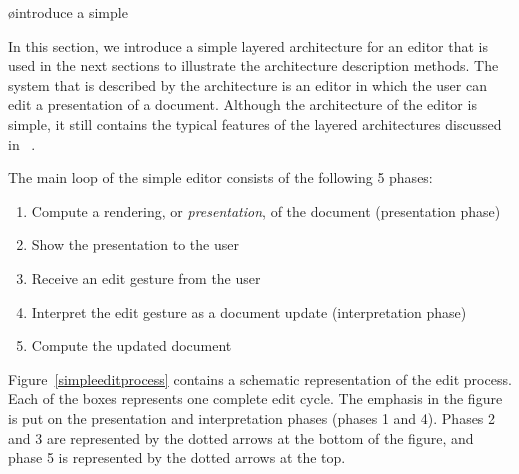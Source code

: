 \bl
\o introduce a simple 
\el

In this section, we introduce a simple layered architecture for an editor that is used in the next sections to illustrate the architecture description methods. The system that is described by the architecture is an editor in which the user can edit a presentation of a document. Although the architecture of the editor is simple, it still contains the typical features of the layered architectures discussed in~\cite{architecture} . 

\bc
{}The main loop of the simple editor consists of the following 5 phases: 
 \begin{enumerate}
 \item Compute a rendering, or {\it presentation}, of the document  (presentation phase)
 \item Show the presentation to the user
 \item Receive an edit gesture from the user
 \item Interpret the edit gesture as a document update (interpretation phase)
 \item Compute the updated document
 \end{enumerate} 

Figure~\ref{simpleeditprocess} contains a schematic representation of the edit process. Each of the boxes represents one complete edit cycle. The emphasis in the figure is put on the presentation and interpretation phases (phases 1 and 4). Phases 2 and 3 are represented by the dotted arrows at the bottom of the figure, and phase 5 is represented by the dotted arrows at the top.
\ec

